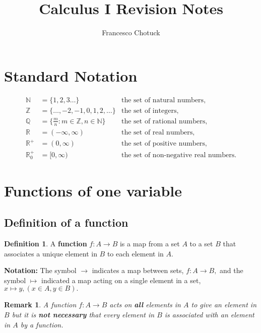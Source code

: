 \documentclass[12pt, a4paper]{article}
\title{Calculus I Revision Notes}
\date{}
\author{Francesco Chotuck}
\newcommand{\bb}[1]{\mathbb{#1}}
\newcommand{\f}[2]{\frac{#1}{#2}}
\newtheorem*{remark}{Remark}
\theoremstyle{definition}
\newtheorem{definition}{Definition}[section]
\theoremstyle{plain}
\begin{document}
 
\maketitle 

\tableofcontents

\pagebreak

\section{Standard Notation}

$$\begin{aligned}
\bb{N}&=\{1,2,3\ldots\} &\text{the set of natural numbers,} \\
\bb{Z}&=\{\ldots,-2,-1,0,1,2,\ldots\} &\text{the set of integers,} \\
\bb{Q}&=\{\f{m}{n}:m\in\bb{Z}, n\in\bb{N}\} &\text{the set of rational numbers,} \\
\bb{R}&= (-\infty,\infty) &\text{the set of real numbers,} \\
\bb{R}^+&= (0,\infty)&\text{the set of positive numbers,} \\
\bb{R}_0^+ &= [0,\infty) &\text{the set of non-negative real numbers.}
\end{aligned}$$

\pagebreak

\section{Functions of one variable}

\subsection{Definition of a function}

\begin{definition}
A \textbf{function} $f:A\to B$ is a map from a set $A$ to a set $B$ that associates a unique element in $B$ to each element in $A.$
\end{definition} 

\textbf{Notation:} The symbol $\to$ indicates a map between sets, $f:A\to B,$ and the symbol $\mapsto$ indicated a map acting on a single element in a set, $x\mapsto y,(x\in A,y\in B).$

\begin{remark}
A function $f:A\to B$ acts on \textbf{all} elements in $A$ to give an element in $B$ but it is \textbf{not necessary} that every element in $B$ is associated with an element in $A$ by a function.
\end{remark}
\end{document}
